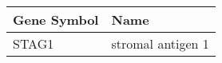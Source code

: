 \begin{tabular}{ll}
\toprule
Gene Symbol &              Name \\
\midrule
      STAG1 & stromal antigen 1 \\
\bottomrule
\end{tabular}
